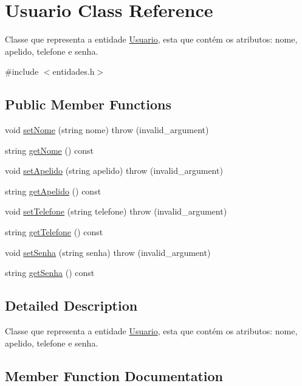 \hypertarget{classUsuario}{}\section{Usuario Class Reference}
\label{classUsuario}


Classe que representa a entidade \hyperlink{classUsuario}{Usuario}, esta que contém os atributos\+: nome, apelido, telefone e senha.  




{\ttfamily \#include $<$entidades.\+h$>$}

\subsection*{Public Member Functions}
\begin{DoxyCompactItemize}
\item 
void \hyperlink{classUsuario_a7c9b128fcb7b02e6595200ad1cf6f89b}{set\+Nome} (string nome)  throw (invalid\+\_\+argument)
\item 
string \hyperlink{classUsuario_a6aeb8cccd96e84aedeb50a68b4f9a3d4}{get\+Nome} () const
\item 
void \hyperlink{classUsuario_ae1c5a1f4d241bfd859ba8d12271265c7}{set\+Apelido} (string apelido)  throw (invalid\+\_\+argument)
\item 
string \hyperlink{classUsuario_a78d374a50eed8b7ceeec4b874ba154d4}{get\+Apelido} () const
\item 
void \hyperlink{classUsuario_a8414f48478d2edf70a4ab274136a3bdf}{set\+Telefone} (string telefone)  throw (invalid\+\_\+argument)
\item 
string \hyperlink{classUsuario_ae2a44b0716930c62458e6fc8c7339537}{get\+Telefone} () const
\item 
void \hyperlink{classUsuario_ad6ca0fc126212f12a73e7e8536646d60}{set\+Senha} (string senha)  throw (invalid\+\_\+argument)
\item 
string \hyperlink{classUsuario_a5a6149716b03d4b1408aaa6a0dc4bb32}{get\+Senha} () const
\end{DoxyCompactItemize}


\subsection{Detailed Description}
Classe que representa a entidade \hyperlink{classUsuario}{Usuario}, esta que contém os atributos\+: nome, apelido, telefone e senha. 

\subsection{Member Function Documentation}
\mbox{\label{classUsuario_a78d374a50eed8b7ceeec4b874ba154d4}} 
